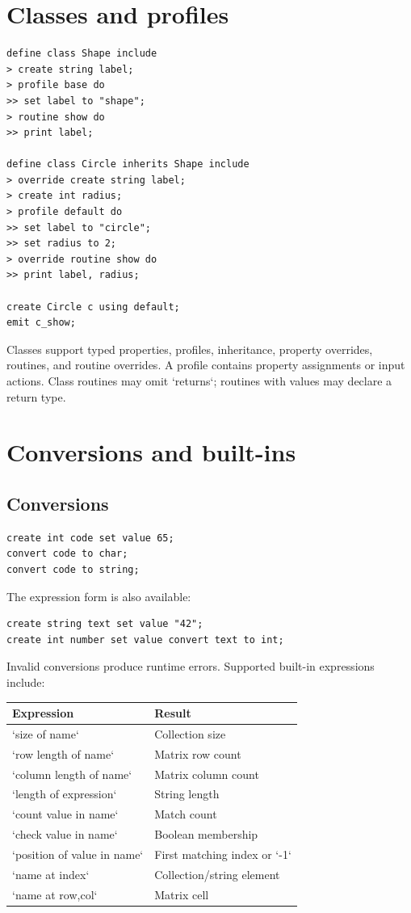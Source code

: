 \documentclass[10.5pt,a4paper]{article}
\begin{document}
\section{Classes and profiles}
\begin{lstlisting}
define class Shape include
> create string label;
> profile base do
>> set label to "shape";
> routine show do
>> print label;

define class Circle inherits Shape include
> override create string label;
> create int radius;
> profile default do
>> set label to "circle";
>> set radius to 2;
> override routine show do
>> print label, radius;

create Circle c using default;
emit c_show;
\end{lstlisting}
Classes support typed properties, profiles, inheritance, property overrides, routines, and routine overrides. A profile contains property assignments or input actions. Class routines may omit `returns`; routines with values may declare a return type.
\section{Conversions and built-ins}
\subsection{Conversions}
\begin{lstlisting}
create int code set value 65;
convert code to char;
convert code to string;
\end{lstlisting}
The expression form is also available:
\begin{lstlisting}
create string text set value "42";
create int number set value convert text to int;
\end{lstlisting}
Invalid conversions produce runtime errors. Supported built-in expressions include:
\begin{tabularx}{\textwidth}{l X}\toprule Expression & Result\\\midrule
`size of name` & Collection size\\
`row length of name` & Matrix row count\\
`column length of name` & Matrix column count\\
`length of expression` & String length\\
`count value in name` & Match count\\
`check value in name` & Boolean membership\\
`position of value in name` & First matching index or `-1`\\
`name at index` & Collection/string element\\
`name at row,col` & Matrix cell\\\bottomrule\end{tabularx}
\end{document}
